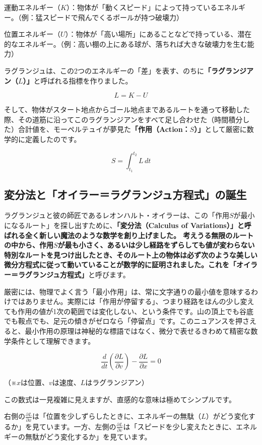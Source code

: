 運動エネルギー（\(K\)）：物体が「動くスピード」によって持っているエネルギー。（例：猛スピードで飛んでくるボールが持つ破壊力）

位置エネルギー（\(U\)）：物体が「高い場所」にあることなどで持っている、潜在的なエネルギー。（例：高い棚の上にある球が、落ちれば大きな破壊力を生む能力）

ラグランジュは、この2つのエネルギーの「差」を表す、のちに\textbf{「ラグランジアン（\(L\)）」}と呼ばれる指標を作りました。

\[
L=K-U
\]

そして、物体がスタート地点からゴール地点まであるルートを通って移動した際、その道筋に沿ってこのラグランジアンをすべて足し合わせた（時間積分した）合計値を、モーペルテュイが夢見た\textbf{「作用（Action：\(S\)）」}として厳密に数学的に定義したのです。

\[
S=\int_{t_1}^{t_2}L\,dt
\]

\subsection{変分法と「オイラー＝ラグランジュ方程式」の誕生}

ラグランジュと彼の師匠であるレオンハルト・オイラーは、この「作用\(S\)が最小になるルート」を探し出すために、\textbf{「変分法（Calculus of Variations）」と呼ばれる全く新しい魔法のような数学を創り上げました。 考えうる無限のルートの中から、作用\(S\)が最も小さく、あるいは少し経路をずらしても値が変わらない特別なルートを見つけ出したとき、そのルート上の物体は必ず次のような美しい微分方程式に従って動いていることが数学的に証明されました。これを「オイラー＝ラグランジュ方程式」}と呼びます。

厳密には、物理でよく言う「最小作用」は、常に文字通りの最小値を意味するわけではありません。実際には「作用が停留する」、つまり経路をほんの少し変えても作用の値が1次の範囲では変化しない、という条件です。山の頂上でも谷底でも鞍点でも、足元の傾きがゼロなら「停留点」です。このニュアンスを押さえると、最小作用の原理は神秘的な標語ではなく、微分で表せるきわめて精密な数学条件として理解できます。

\[
\frac{d}{dt}\left(\frac{\partial L}{\partial v}\right)-\frac{\partial L}{\partial x}=0
\]

（※\(x\)は位置、\(v\)は速度、\(L\)はラグランジアン）

この数式は一見複雑に見えますが、直感的な意味は極めてシンプルです。

右側の\(\frac{\partial L}{\partial x}\)は「位置を少しずらしたときに、エネルギーの無駄（\(L\)）がどう変化するか」を見ています。一方、左側の\(\frac{\partial L}{\partial v}\)は「スピードを少し変えたときに、エネルギーの無駄がどう変化するか」を見ています。

